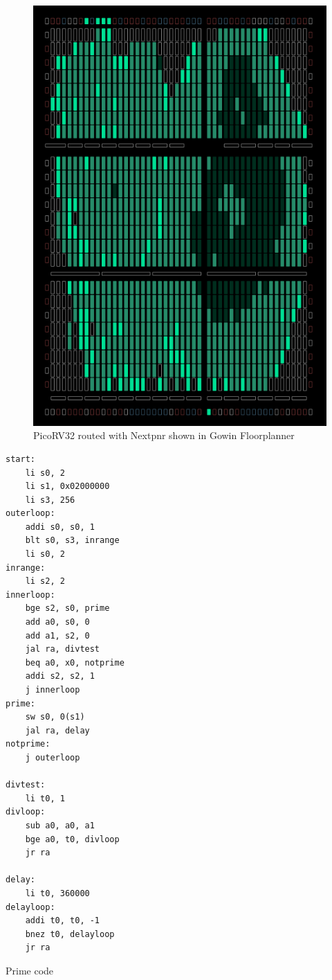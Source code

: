 \documentclass{article}
\begin{document}
\begin{figure}
    \centering
    \includegraphics[width=\textwidth]{fig/picorv.png}
    \caption{PicoRV32 routed with Nextpnr shown in Gowin Floorplanner}
    \label{fig:picorv}
\end{figure}

\begin{listing}
        \centering
\begin{verbatim}
start:
    li s0, 2
    li s1, 0x02000000
    li s3, 256
outerloop:
    addi s0, s0, 1
    blt s0, s3, inrange
    li s0, 2
inrange:
    li s2, 2
innerloop:
    bge s2, s0, prime
    add a0, s0, 0
    add a1, s2, 0
    jal ra, divtest
    beq a0, x0, notprime
    addi s2, s2, 1
    j innerloop
prime:
    sw s0, 0(s1)
    jal ra, delay
notprime:
    j outerloop

divtest: 
    li t0, 1
divloop:
    sub a0, a0, a1
    bge a0, t0, divloop
    jr ra
    
delay:
    li t0, 360000
delayloop:
    addi t0, t0, -1
    bnez t0, delayloop
    jr ra
\end{verbatim}
    \caption{Prime code \cite{prime}}
    \label{fig:prime}
\end{listing}
\end{document}
